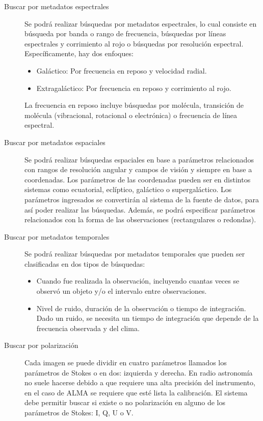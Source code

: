 \begin{description}
	\item[Buscar por metadatos espectrales] Se podrá realizar búsquedas por metadatos espectrales, lo cual consiste en búsqueda por banda o	rango de frecuencia, búsquedas por líneas espectrales y corrimiento al rojo o búsquedas por resolución espectral. Específicamente, hay dos enfoques:
		\begin{itemize}
			\item Galáctico: Por frecuencia en reposo y velocidad radial.
			\item Extragaláctico: Por frecuencia en reposo y corrimiento al rojo.
		\end{itemize}
		La frecuencia en reposo incluye búsquedas por mol\'ecula, transición de mol\'ecula (vibracional, rotacional o electrónica) o frecuencia de línea espectral.
	\item[Buscar por metadatos espaciales] Se podrá realizar búsquedas espaciales en base a parámetros relacionados con rangos de resolución angular y campos de visión y siempre en base a coordenadas. Los parámetros de las coordenadas pueden ser en distintos sistemas como ecuatorial, eclíptico, galáctico o supergaláctico. Los parámetros ingresados se convertirán al sistema de la fuente de datos, para así poder realizar las búsquedas. Además, se podrá especificar parámetros relacionados con la forma de las observaciones (rectangulares o redondas).
	\item[Buscar por metadatos temporales] Se podrá realizar búsquedas por metadatos temporales que pueden ser clasificadas en dos tipos de	búsquedas:
		\begin{itemize}
			\item Cuando fue realizada la observación, incluyendo cuantas veces se observó un objeto y/o el	intervalo entre observaciones.
			\item Nivel de ruido, duración de la observación o tiempo de integración. Dado un ruido, se necesita un tiempo de integración que depende de la frecuencia observada y del clima.
		\end{itemize}
	\item[Buscar por polarización] Cada imagen se puede dividir en cuatro parámetros llamados los parámetros de Stokes o en dos: izquierda y derecha. En radio astronomía no suele hacerse debido a que requiere una alta precisión	del instrumento, en el caso de ALMA se requiere que est\'e lista la calibración. El sistema debe permitir buscar si existe o no polarización en alguno de los parámetros de Stokes: I, Q, U o V.

\end{description}
